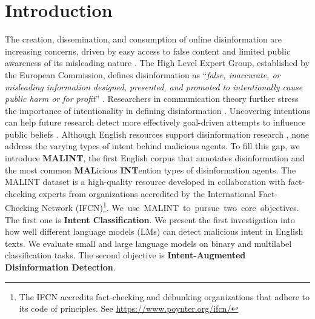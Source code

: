 \documentclass[11pt]{article}
\begin{document}
\section{Introduction}
\label{sec:intro}

The creation, dissemination, and consumption of online disinformation are increasing concerns, driven by easy access to false content and limited public awareness of its misleading nature \cite{shu2020combating}. The High Level Expert Group, established by the European Commission, defines disinformation as “\textit{false, inaccurate, or misleading information designed, presented, and promoted to intentionally cause public harm or for profit}” \cite{de2018multi}. 
Researchers in communication theory further stress the importance of intentionality in defining disinformation \cite{hameleers2023disinformation}.
Uncovering intentions can help future research detect more effectively goal-driven attempts to influence public beliefs \cite{hameleers2023disinformation}. Although English resources support disinformation research \cite{wang2017liar, shu2020fakenewsnet, ahmed2018detecting}, none address the varying types of intent behind malicious agents. To fill this gap, we introduce \textbf{MALINT}, the first English corpus that annotates disinformation and the most common \textbf{MAL}icious \textbf{INT}ention types of disinformation agents. The MALINT  dataset is a high-quality resource developed in collaboration with fact-checking experts from organizations accredited by the International Fact-Checking Network (IFCN)\footnote{The IFCN accredits fact-checking and debunking organizations that adhere to its code of principles. See \url{ https://www.poynter.org/ifcn/}}. \mbox{We use MALINT to pursue two core objectives.} %
The first one is \textbf{Intent Classification}.
We present the first investigation into how well different language models (LMs) can detect malicious intent in English texts. We evaluate small and large language models on binary and multilabel classification tasks.
The second objective is \textbf{Intent-Augmented Disinformation Detection}.
\end{document}
